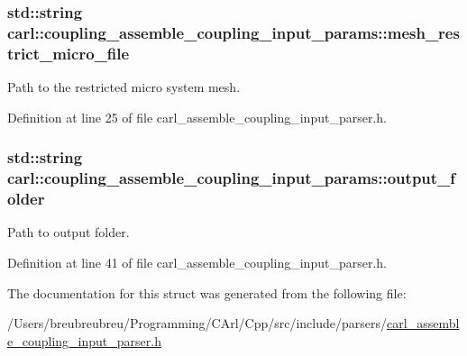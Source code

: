 \hypertarget{structcarl_1_1coupling__assemble__coupling__input__params_ab73f9619bf9653bd3ed2cd019dff5f04}{}
\subsubsection[{mesh\+\_\+restrict\+\_\+micro\+\_\+file}]{\setlength{\rightskip}{0pt plus 5cm}std\+::string carl\+::coupling\+\_\+assemble\+\_\+coupling\+\_\+input\+\_\+params\+::mesh\+\_\+restrict\+\_\+micro\+\_\+file}\label{structcarl_1_1coupling__assemble__coupling__input__params_ab73f9619bf9653bd3ed2cd019dff5f04}


Path to the restricted micro system mesh. 



Definition at line 25 of file carl\+\_\+assemble\+\_\+coupling\+\_\+input\+\_\+parser.\+h.

\hypertarget{structcarl_1_1coupling__assemble__coupling__input__params_a1344edd32f644b03b19a499e47fb1ca4}{}
\subsubsection[{output\+\_\+folder}]{\setlength{\rightskip}{0pt plus 5cm}std\+::string carl\+::coupling\+\_\+assemble\+\_\+coupling\+\_\+input\+\_\+params\+::output\+\_\+folder}\label{structcarl_1_1coupling__assemble__coupling__input__params_a1344edd32f644b03b19a499e47fb1ca4}


Path to output folder. 



Definition at line 41 of file carl\+\_\+assemble\+\_\+coupling\+\_\+input\+\_\+parser.\+h.



The documentation for this struct was generated from the following file\+:\begin{DoxyCompactItemize}
\item 
/\+Users/breubreubreu/\+Programming/\+C\+Arl/\+Cpp/src/include/parsers/\hyperlink{carl__assemble__coupling__input__parser_8h}{carl\+\_\+assemble\+\_\+coupling\+\_\+input\+\_\+parser.\+h}\end{DoxyCompactItemize}
